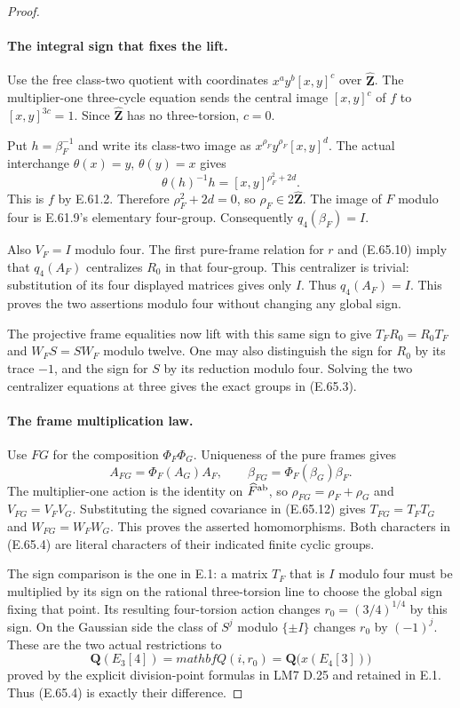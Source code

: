 \begin{proof}
\paragraph{The integral sign that fixes the lift.}
Use the free class-two quotient with coordinates
$x^a y^b[x,y]^c$ over $\widehat{\mathbf Z}$. The multiplier-one
three-cycle equation sends the central image $[x,y]^c$ of $f$
to $[x,y]^{3c}=1$. Since $\widehat{\mathbf Z}$ has no
three-torsion, $c=0$.

Put $h=\beta_F^{-1}$ and write its class-two image as
$x^{\rho_F}y^{\rho_F}[x,y]^d$. The actual interchange
$\theta(x)=y$, $\theta(y)=x$ gives
\[
 \theta(h)^{-1}h=[x,y]^{\rho_F^2+2d}.
 \tag{E.65.11}
\]
This is $f$ by E.61.2. Therefore $\rho_F^2+2d=0$, so
$\rho_F\in2\widehat{\mathbf Z}$. The image of $\widehat F$
modulo four is E.61.9's elementary four-group. Consequently
$q_4(\beta_F)=I$.

Also $V_F=I$ modulo four. The first pure-frame relation for $r$
and \textup{(E.65.10)} imply that $q_4(A_F)$ centralizes
$R_0$ in that four-group. This centralizer is trivial: substitution
of its four displayed matrices gives only $I$. Thus $q_4(A_F)=I$.
This proves the two assertions modulo four without changing any
global sign.

The projective frame equalities now lift with this same sign to
give $T_FR_0=R_0T_F$ and $W_FS=SW_F$ modulo twelve. One may
also distinguish the sign for $R_0$ by its trace $-1$, and the
sign for $S$ by its reduction modulo four. Solving the two
centralizer equations at three gives the exact groups in
\textup{(E.65.3)}.

\paragraph{The frame multiplication law.}
Use $FG$ for the composition $\Phi_F\Phi_G$.
Uniqueness of the pure frames gives
\[
 A_{FG}=\Phi_F(A_G)A_F,\qquad
 \beta_{FG}=\Phi_F(\beta_G)\beta_F.
 \tag{E.65.12}
\]
The multiplier-one action is the identity on $\widehat F^{\rm ab}$,
so $\rho_{FG}=\rho_F+\rho_G$ and $V_{FG}=V_FV_G$.
Substituting the signed covariance in \textup{(E.65.12)} gives
$T_{FG}=T_FT_G$ and $W_{FG}=W_FW_G$. This proves the asserted
homomorphisms. Both characters in \textup{(E.65.4)} are literal
characters of their indicated finite cyclic groups.

The sign comparison is the one in E.1: a matrix $T_F$ that is $I$
modulo four must be multiplied by its sign on the rational
three-torsion line to choose the global sign fixing that point.
Its resulting four-torsion action changes $r_0=(3/4)^{1/4}$
by this sign. On the Gaussian side the class of $S^j$ modulo
$\{\pm I\}$ changes $r_0$ by $(-1)^j$. These are the two
actual restrictions to
\[
 \mathbf Q(E_3[4])=mathbf Q(i,r_0)
              =\mathbf Q\bigl(x(E_4[3])\bigr)
 \tag{E.65.13}
\]
proved by the explicit division-point formulas in LM7 D.25 and
retained in E.1. Thus \textup{(E.65.4)} is exactly their difference.


\end{proof}
